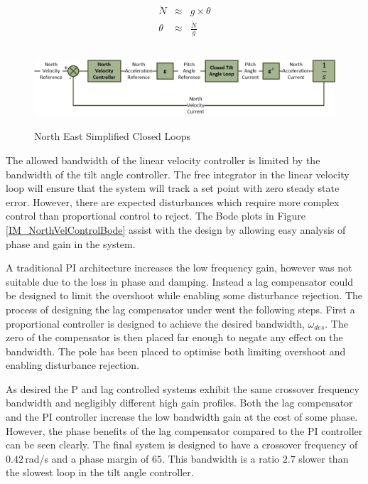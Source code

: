 \documentclass[12pt]{report}
\begin{document}
\begin{eqnarray}
\ddot{N} &\approx& g\times \theta \label{EQ_LinearNorthVel2}\\\label{EQ_LinearNorthVel3}
\theta 	&\approx& \frac{\ddot{N}}{g} \label{EQ_LinearNorthVel4}
\end{eqnarray}

\begin{figure}[H]
	\centering
	\includegraphics[height = 2.9cm]{../References/Diagrams/NorthVelocityLoop.jpg}
	\caption{North East Simplified Closed Loops}
	\label{IM_NorthVelocityLoop}
\end{figure}

The allowed bandwidth of the linear velocity controller is limited by the bandwidth of the tilt angle controller. The free integrator in the linear velocity loop will ensure that the system will track a set point with zero steady state error. However, there are expected disturbances which require more complex control than proportional control to reject. The Bode plots in Figure \ref{IM_NorthVelControlBode} assist with the design by allowing easy analysis of phase and gain in the system.

A traditional PI architecture increases the low frequency gain, however was not suitable due to the loss in phase and damping. Instead a lag compensator could be designed to limit the overshoot while enabling some disturbance rejection. The process of designing the lag compensator under went the following steps. First a proportional controller is designed to achieve the desired bandwidth, $\omega_{des}$. The zero of the compensator is then placed far enough to negate any effect on the bandwidth. The pole has been placed to optimise both limiting overshoot and enabling disturbance rejection.

As desired the P and lag controlled systems exhibit the same crossover frequency bandwidth and negligibly different high gain profiles. Both the lag compensator and the PI controller increase the low bandwidth gain at the cost of some phase. However, the phase benefits of the lag compensator compared to the PI controller can be seen clearly. The final system is designed to have a crossover frequency of $0.42$\,rad/s and a phase margin of $65$\textdegree. This bandwidth is a ratio $2.7$ slower than the slowest loop in the tilt angle controller.
\end{document}
